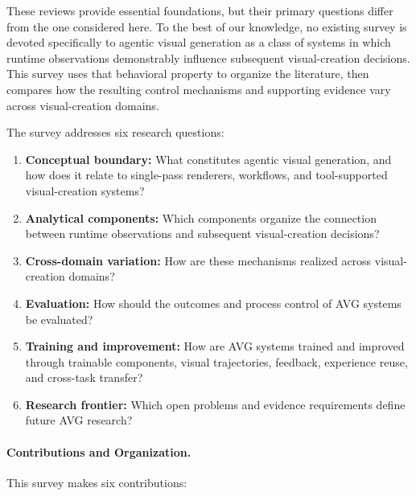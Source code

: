 These reviews provide essential foundations, but their primary questions differ from the one considered here. To the best of our knowledge, no existing survey is devoted specifically to agentic visual generation as a class of systems in which runtime observations demonstrably influence subsequent visual-creation decisions. This survey uses that behavioral property to organize the literature, then compares how the resulting control mechanisms and supporting evidence vary across visual-creation domains.

The survey addresses six research questions:

\begin{enumerate}
  \item \textbf{Conceptual boundary:} What constitutes agentic visual generation, and how does it relate to single-pass renderers, workflows, and tool-supported visual-creation systems?
  \item \textbf{Analytical components:} Which components organize the connection between runtime observations and subsequent visual-creation decisions?
  \item \textbf{Cross-domain variation:} How are these mechanisms realized across visual-creation domains?
  \item \textbf{Evaluation:} How should the outcomes and process control of AVG systems be evaluated?
  \item \textbf{Training and improvement:} How are AVG systems trained and improved through trainable components, visual trajectories, feedback, experience reuse, and cross-task transfer?
  \item \textbf{Research frontier:} Which open problems and evidence requirements define future AVG research?
\end{enumerate}

\paragraph{Contributions and Organization.}
This survey makes six contributions:

